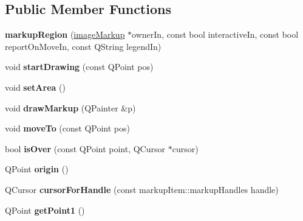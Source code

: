 \subsection*{Public Member Functions}
\begin{DoxyCompactItemize}
\item 
\hypertarget{classmarkupRegion_ac73302b4f9f70b7430e31289ab8fa41b}{
{\bfseries markupRegion} (\hyperlink{classimageMarkup}{imageMarkup} $\ast$ownerIn, const bool interactiveIn, const bool reportOnMoveIn, const QString legendIn)}
\label{classmarkupRegion_ac73302b4f9f70b7430e31289ab8fa41b}

\item 
\hypertarget{classmarkupRegion_aced9ad7afa561e1a20f2313a663282e1}{
void {\bfseries startDrawing} (const QPoint pos)}
\label{classmarkupRegion_aced9ad7afa561e1a20f2313a663282e1}

\item 
\hypertarget{classmarkupRegion_ab190683626c279231fd8eb968b4db544}{
void {\bfseries setArea} ()}
\label{classmarkupRegion_ab190683626c279231fd8eb968b4db544}

\item 
\hypertarget{classmarkupRegion_abf847543e5dd7a6dffb62fa83fa90c8f}{
void {\bfseries drawMarkup} (QPainter \&p)}
\label{classmarkupRegion_abf847543e5dd7a6dffb62fa83fa90c8f}

\item 
\hypertarget{classmarkupRegion_a753ebf156c8cd56ff7e3edc5bf70bab8}{
void {\bfseries moveTo} (const QPoint pos)}
\label{classmarkupRegion_a753ebf156c8cd56ff7e3edc5bf70bab8}

\item 
\hypertarget{classmarkupRegion_a724084202aaedd367c70b5e165183452}{
bool {\bfseries isOver} (const QPoint point, QCursor $\ast$cursor)}
\label{classmarkupRegion_a724084202aaedd367c70b5e165183452}

\item 
\hypertarget{classmarkupRegion_a49c338512f240a3230a1ed2502345064}{
QPoint {\bfseries origin} ()}
\label{classmarkupRegion_a49c338512f240a3230a1ed2502345064}

\item 
\hypertarget{classmarkupRegion_aa7f1bb5ed6324fcc618afe06049ebc81}{
QCursor {\bfseries cursorForHandle} (const markupItem::markupHandles handle)}
\label{classmarkupRegion_aa7f1bb5ed6324fcc618afe06049ebc81}

\item 
\hypertarget{classmarkupRegion_a92d60ad5f5e87b5e23d0344afdc6dbb7}{
QPoint {\bfseries getPoint1} ()}
\label{classmarkupRegion_a92d60ad5f5e87b5e23d0344afdc6dbb7}


\end{DoxyCompactItemize}
